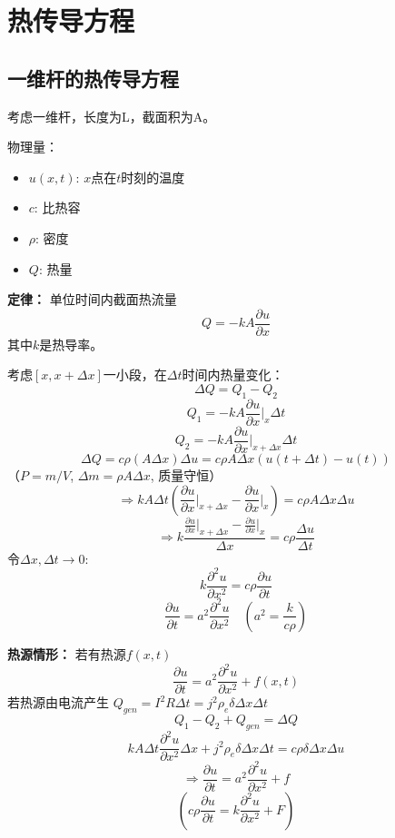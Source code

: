 \documentclass{article}
\begin{document}
	\section*{热传导方程}
	
	\subsection*{一维杆的热传导方程}
	考虑一维杆，长度为L，截面积为A。
	
	物理量：
	\begin{itemize}
		\item $u(x,t)$: $x$点在$t$时刻的温度
		\item $c$: 比热容
		\item $\rho$: 密度
		\item $Q$: 热量
	\end{itemize}
	
	\textbf{定律：} 单位时间内截面热流量
	$$ 
	Q = -kA \frac{\partial u}{\partial x} 
	$$
	其中$k$是热导率。
	
	考虑$[x, x+\Delta x]$一小段，在$\Delta t$时间内热量变化：
	$$ \Delta Q = Q_1 - Q_2 $$
	$$ Q_1 = -kA \frac{\partial u}{\partial x} \Big|_x \Delta t $$
	$$ Q_2 = -kA \frac{\partial u}{\partial x} \Big|_{x+\Delta x} \Delta t $$
	$$ \Delta Q = c \rho (A \Delta x) \Delta u = c \rho A \Delta x (u(t+\Delta t) - u(t)) $$
	（$P=m/V$, $\Delta m = \rho A \Delta x$, 质量守恒）
	$$ \Rightarrow kA \Delta t \left( \frac{\partial u}{\partial x} \Big|_{x+\Delta x} - \frac{\partial u}{\partial x} \Big|_x \right) = c \rho A \Delta x \Delta u $$
	$$ \Rightarrow k \frac{\frac{\partial u}{\partial x} \Big|_{x+\Delta x} - \frac{\partial u}{\partial x} \Big|_x}{\Delta x} = c \rho \frac{\Delta u}{\Delta t} $$
	令$\Delta x, \Delta t \to 0$:
	$$ k \frac{\partial^2 u}{\partial x^2} = c \rho \frac{\partial u}{\partial t} $$
	$$ \frac{\partial u}{\partial t} = a^2 \frac{\partial^2 u}{\partial x^2} \quad (a^2 = \frac{k}{c\rho}) $$
	
	\textbf{热源情形：} 若有热源$f(x,t)$
	$$ 
	\frac{\partial u}{\partial t} = a^2 \frac{\partial^2 u}{\partial x^2} + f(x,t) 
	$$
	若热源由电流产生 $Q_{gen} = I^2 R \Delta t = j^2 \rho_e \delta \Delta x \Delta t$
	$$ Q_1 - Q_2 + Q_{gen} = \Delta Q $$
	$$ kA \Delta t \frac{\partial^2 u}{\partial x^2} \Delta x + j^2 \rho_e \delta \Delta x \Delta t = c \rho \delta \Delta x \Delta u $$
	$$ \Rightarrow \frac{\partial u}{\partial t} = a^2 \frac{\partial^2 u}{\partial x^2} + f $$
	$$ (c\rho \frac{\partial u}{\partial t} = k \frac{\partial^2 u}{\partial x^2} + F) $$
	
\end{document}
